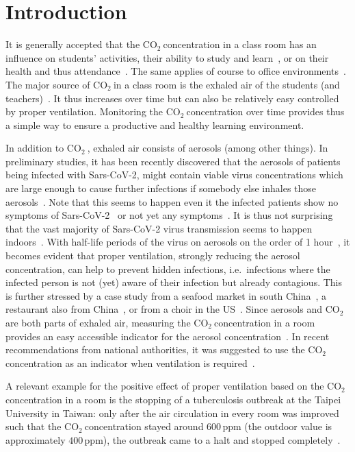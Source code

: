 \documentclass[12pt,a4paper]{article}
\newcommand{\coo}{\ensuremath{\mathrm{CO_2}~}}
\begin{document}
\section{Introduction}\label{s:intro}
It is generally accepted that the \coo concentration in a class room has an influence on students' activities, their ability to study and learn~\cite{TWARDELLA2012,GAIHRE2014}, or on their health and thus attendance~\cite{SHENDELL2004}. The same applies of course to office environments~\cite{ALLEN2016}. The major source of \coo in a class room is the exhaled air of the students (and teachers)~\cite{PERSILY2017}. It thus increases over time but can also be relatively easy controlled by proper ventilation. Monitoring the \coo concentration over time provides thus a simple way to ensure a productive and healthy learning environment. 

In addition to \coo, exhaled air consists of aerosols (among other things). In preliminary studies, it has been recently discovered that the aerosols of patients being infected with Sars-CoV-2, might contain viable virus concentrations which are large enough to cause further infections if somebody else inhales those aerosols~\cite{LEDNICKY2020,MORAWSKA2020,KOHANSKI2020}. Note that this seems to happen even it the infected patients show no symptoms of Sars-CoV-2~\cite{FURUKAWA2020} or not yet any symptoms~\cite{SUN2020}. It is thus not surprising that the vast majority of Sars-CoV-2 virus transmission seems to happen indoors~\cite{QIAN2020}. With half-life periods of the virus on aerosols on the order of 1 hour~\cite{DOREMALEN2020}, it becomes evident that proper ventilation, strongly reducing the aerosol concentration, can help to prevent hidden infections, i.e.\ infections where the infected person is not (yet) aware of their infection but already contagious. This is further stressed by a case study from a seafood market in south China~\cite{ZHANG2020}, a restaurant also from China~\cite{LI2020}, or from a choir in the US~\cite{MILLER2020}. Since aerosols and \coo are both parts of exhaled air, measuring the \coo concentration in a room provides an easy accessible indicator for the aerosol concentration~\cite{HARTMANN2020}. In recent recommendations from national authorities, it was suggested to use the \coo concentration as an indicator when ventilation is required~\cite{VOSS2020,BMA2020a,RKI2020}.

A relevant example for the positive effect of proper ventilation based on the \coo concentration in a room is the stopping of a tuberculosis outbreak at the Taipei University in Taiwan: only after the air circulation in every room was improved such that the \coo concentration stayed around $600\,\mathrm{ppm}$ (the outdoor value is approximately $400\,\mathrm{ppm}$), the outbreak came to a halt and stopped completely~\cite{DU2020}.
\end{document}

